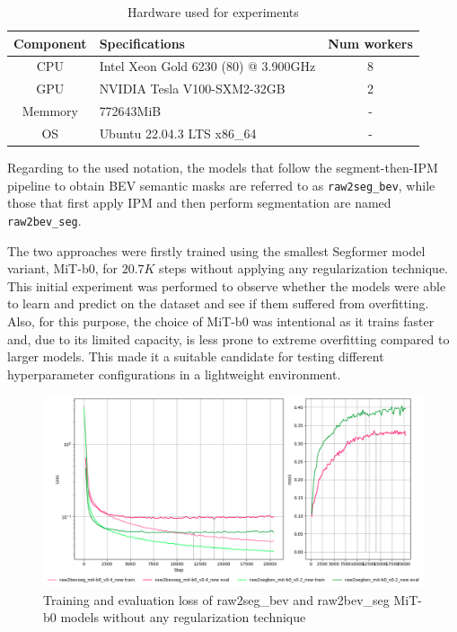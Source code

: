 \begin{table}[h]
    \centering
    \begin{tabular}{c l c}
        \toprule
        \textbf{Component} & \textbf{Specifications} & \textbf{Num workers} \\
        \midrule
        CPU         & Intel Xeon Gold 6230 (80) @ 3.900GHz & 8 \\
        GPU         & NVIDIA Tesla V100-SXM2-32GB & 2 \\      
        Memmory     & 772643MiB & - \\
        OS          & Ubuntu 22.04.3 LTS x86\_64 & - \\
        \bottomrule
    \end{tabular}
    \caption{ Hardware used for experiments }
    \label{tab:hardware}
\end{table}

Regarding to the used notation, the models that follow the segment-then-IPM pipeline to obtain BEV semantic masks are referred to as \texttt{raw2seg\_bev}, while those that first apply IPM and then perform segmentation are named \texttt{raw2bev\_seg}.

The two approaches were firstly trained using the smallest Segformer model variant, MiT-b0, for $20.7K$ steps without applying any regularization technique. This initial experiment was performed to observe whether the models were able to learn and predict on the dataset and see if them suffered from overfitting. Also, for this purpose, the choice of MiT-b0 was intentional as it trains faster and, due to its limited capacity, is less prone to extreme overfitting compared to larger models. This made it a suitable candidate for testing different hyperparameter configurations in a lightweight environment.

\begin{figure}[h!]
    \centering
    \includegraphics[width=0.7\linewidth]{./images/experiments/overfitting_bev_nu.png}
    \caption{Training and evaluation loss of raw2seg\_bev and raw2bev\_seg MiT-b0 models without any regularization technique}
    \label{fig:overfitting_mit-b0}
\end{figure}

